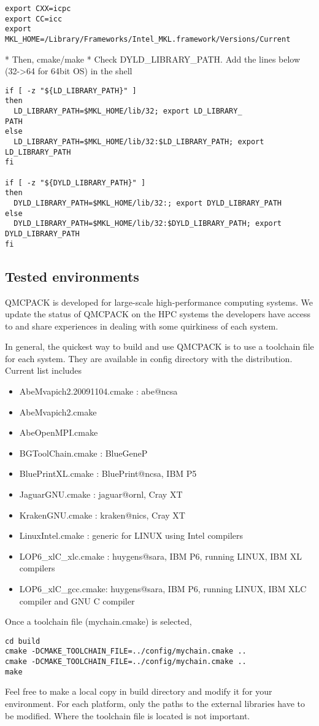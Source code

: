 \begin{verbatim}
export CXX=icpc
export CC=icc
export MKL_HOME=/Library/Frameworks/Intel_MKL.framework/Versions/Current
\end{verbatim}

    * Then, cmake/make
    * Check DYLD\_LIBRARY\_PATH. Add the lines below (32->64 for 64bit OS) in the shell 

\begin{verbatim}
if [ -z "${LD_LIBRARY_PATH}" ]
then
  LD_LIBRARY_PATH=$MKL_HOME/lib/32; export LD_LIBRARY_
PATH
else
  LD_LIBRARY_PATH=$MKL_HOME/lib/32:$LD_LIBRARY_PATH; export LD_LIBRARY_PATH
fi

if [ -z "${DYLD_LIBRARY_PATH}" ]
then
  DYLD_LIBRARY_PATH=$MKL_HOME/lib/32:; export DYLD_LIBRARY_PATH
else
  DYLD_LIBRARY_PATH=$MKL_HOME/lib/32:$DYLD_LIBRARY_PATH; export DYLD_LIBRARY_PATH
fi
\end{verbatim}

\subsection{Tested environments}
QMCPACK is developed for large-scale high-performance computing systems. We update the status of QMCPACK on the HPC systems the developers have access to and share experiences in dealing with some quirkiness of each system.

In general, the quickest way to build and use QMCPACK is to use a toolchain file for each system. They are available in config directory with the distribution. Current list includes
\begin{itemize}
\item{} AbeMvapich2.20091104.cmake : abe@ncsa
\item{} AbeMvapich2.cmake
\item{} AbeOpenMPI.cmake
\item{} BGToolChain.cmake : BlueGeneP
\item{} BluePrintXL.cmake : BluePrint@ncsa, IBM P5
\item{} JaguarGNU.cmake : jaguar@ornl, Cray XT
\item{} KrakenGNU.cmake : kraken@nics, Cray XT
\item{} LinuxIntel.cmake : generic for LINUX using Intel compilers
\item{} LOP6\_xlC\_xlc.cmake : huygens@sara, IBM P6, running LINUX, IBM XL compilers
\item{} LOP6\_xlC\_gcc.cmake: huygens@sara, IBM P6, running LINUX, IBM XLC compiler and GNU C compiler
\end{itemize}
Once a toolchain file (mychain.cmake)  is selected,
\begin{verbatim}
cd build
cmake -DCMAKE_TOOLCHAIN_FILE=../config/mychain.cmake ..
cmake -DCMAKE_TOOLCHAIN_FILE=../config/mychain.cmake ..
make
\end{verbatim}
Feel free to make a local copy in build directory and modify it for your environment. For each platform, only the paths to the external libraries have to be modified. Where the toolchain file is located is not important.

